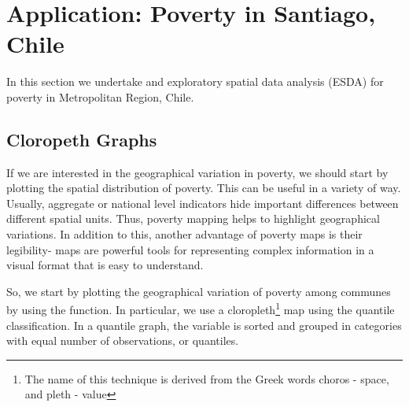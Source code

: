 \documentclass[english,12pt]{book}\usepackage[]{graphicx}\usepackage[]{xcolor}
\begin{document}



\section{Application: Poverty in Santiago, Chile}

In this section we undertake and exploratory spatial data analysis (ESDA) for poverty in Metropolitan Region, Chile.  


\subsection{Cloropeth Graphs}

If we are interested in the geographical variation in poverty, we should start by plotting the spatial distribution of poverty.  This can be useful in a variety of way.  Usually, aggregate or national level indicators hide important differences between different spatial units. Thus, poverty mapping helps to highlight geographical variations.  In addition to this, another advantage of poverty maps is their legibility- maps are powerful tools for representing complex information in a visual format that is easy to understand. 

So, we start by plotting the geographical variation of poverty among communes by using the  function. In particular, we use a cloropleth\footnote{The name of this technique is derived from the Greek words choros - space, and pleth - value} map using the quantile classification. In a quantile graph, the variable is sorted and grouped in categories with equal number of observations, or quantiles. 
\end{document}
